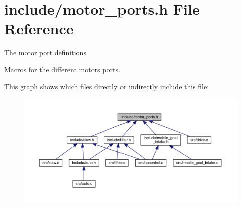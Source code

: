 \section{include/motor\+\_\+ports.h File Reference}
\label{motor__ports_8h}


The motor port definitions

Macros for the different motors ports.  


This graph shows which files directly or indirectly include this file\+:
\nopagebreak
\begin{figure}[H]
\begin{center}
\leavevmode
\includegraphics[width=350pt]{motor__ports_8h__dep__incl}
\end{center}
\end{figure}
